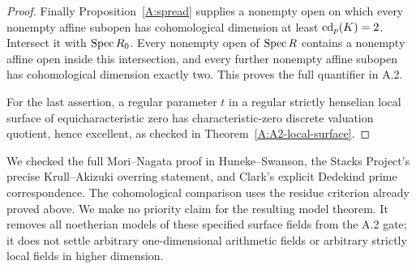 \begin{proof}
Finally Proposition~\ref{A:spread} supplies a nonempty open on
which every nonempty affine subopen has cohomological dimension
at least $\operatorname{cd}_p(K)=2$. Intersect it with $\operatorname{Spec} R_0$.
Every nonempty open of $\operatorname{Spec} R$ contains a nonempty affine open
inside this intersection, and every further nonempty affine
subopen has cohomological dimension exactly two. This proves the
full quantifier in A.2.

For the last assertion, a regular parameter $t$ in a regular
strictly henselian local surface of equicharacteristic zero has
characteristic-zero discrete valuation quotient, hence excellent,
as checked in Theorem~\ref{A:A2-local-surface}.
\end{proof}

\begin{remark}
We checked the full Mori--Nagata proof in Huneke--Swanson,
the Stacks Project's precise Krull--Akizuki overring statement,
and Clark's explicit Dedekind prime correspondence. The
cohomological comparison uses the residue criterion already proved
above. We make no priority claim for the resulting model theorem.
It removes all noetherian models of these specified surface fields
from the A.2 gate; it does not settle arbitrary one-dimensional
arithmetic fields or arbitrary strictly local fields in higher
dimension.
\end{remark}
